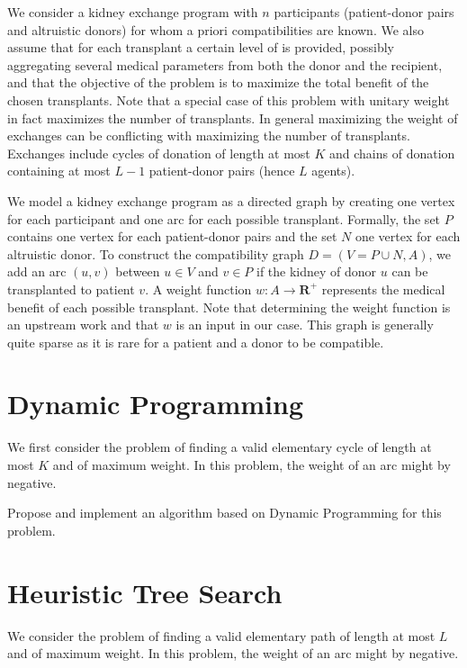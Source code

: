 \documentclass[a4paper]{article}
\newcommand{\R}{\mathbf{R}}
\begin{document}
We consider a kidney exchange program with $n$ participants (patient-donor pairs and altruistic donors) for whom a priori compatibilities are known. We also assume that for each transplant a certain level of  is provided, possibly aggregating several medical parameters from both the donor and the recipient, and that the objective of the problem is to maximize the total benefit of the chosen transplants. Note that a special case of this problem with unitary weight in fact maximizes the number of transplants. In general maximizing the weight of exchanges can be conflicting with maximizing the number of transplants. Exchanges include cycles of donation of length at most $K$ and chains of donation containing at most $L - 1$ patient-donor pairs (hence $L$ agents).

We model a kidney exchange program as a directed graph by creating one vertex for each participant and one arc for each possible transplant. Formally, the set $P$ contains one vertex for each patient-donor pairs and the set $N$ one vertex for each altruistic donor. To construct the compatibility graph $D = (V = P \cup N, A)$, we add an arc $(u, v)$ between $u \in V$ and $v \in P$ if the kidney of donor $u$ can be transplanted to patient $v$. A weight function $w: A \to \R^+$ represents the medical benefit of each possible transplant. Note that determining the weight function is an upstream work and that $w$ is an input in our case. This graph is generally quite sparse as it is rare for a patient and a donor to be compatible.

\section{Dynamic Programming}

We first consider the problem of finding a valid elementary cycle of length at most $K$ and of maximum weight. In this problem, the weight of an arc might by negative.

Propose and implement an algorithm based on Dynamic Programming for this problem.

\section{Heuristic Tree Search}

We consider the problem of finding a valid elementary path of length at most $L$ and of maximum weight. In this problem, the weight of an arc might by negative.
\end{document}

